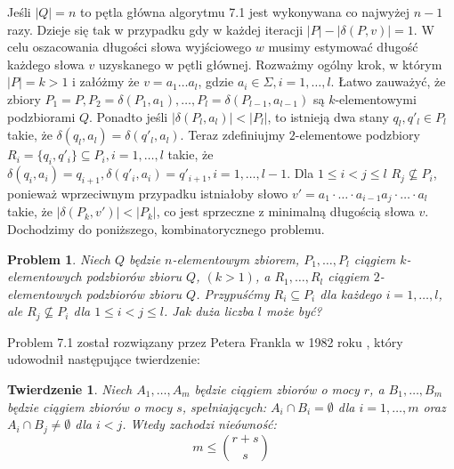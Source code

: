 \documentclass[12pt,a4paper]{article}
\newtheorem{twr}{Twierdzenie}[section]
\newtheorem{pro}{Problem}[section]
\begin{document}
 
Je\'sli $|Q|=n$ to p\k{e}tla g{\l}\'owna algorytmu 7.1 jest wykonywana co najwy\.zej $n-1$ razy. Dzieje si\k{e} tak w  przypadku gdy w każdej iteracji $|P|-|\delta(P,v)|=1$. W celu oszacowania d{\l}ugo\'sci s{\l}owa wyj\'sciowego $w$ musimy estymowa\'c d{\l}ugo\'s\'c ka\.zdego s{\l}owa $v$ uzyskanego w  p\k{e}tli g{\l}\'ownej. 
Rozwa\.zmy og\'olny krok, w kt\'orym $|P|=k>1$ i za{\l}\'o\.zmy \.ze $v=a_{1}\ldots a_{l}$, gdzie $a_{i}\in \Sigma, i=1,\ldots, l$. {\L}atwo zauwa\.zy\'c, \.ze zbiory $P_{1}=P, P_{2}=\delta(P_{1},a_{1}),\ldots, P_{l}=\delta(P_{l-1},a_{l-1})$ s\k{a} $k$-elementowymi podzbiorami $Q$. Ponadto je\'sli $|\delta(P_{l},a_{l})|<|P_{l}|$, to istniej\k{a} dwa stany $q_{l},q'_{l}\in P_{l}$ takie, \.ze $\delta(q_{l},a_{l})=\delta(q'_{l},a_{l})$. Teraz zdefiniujmy  $2$-elementowe podzbiory $R_{i}=\{q_{i},q'_{i}\}\subseteq P_{i}, i=1,\ldots,l$ takie, \.ze $\delta(q_{i},a_{i})=q_{i+1}, \delta(q'_{i},a_{i})=q'_{i+1}, i=1,\ldots,l-1$. Dla $1\leq i<j\leq l$ $R_{j}\not\subseteq P_{i}$, poniewa\.z wprzeciwnym przypadku istnia{\l}oby s{\l}owo $v'=a_{1}\cdot\ldots\cdot a_{i-1}a_{j}\cdot\ldots\cdot a_{l}$ takie, \.ze $|\delta(P_{k},v')|<|P_{k}|$, co jest sprzeczne z  minimaln\k{a} d{\l}ugo\'sci\k{a} s{\l}owa $v$. Dochodzimy do poni\.zszego, kombinatorycznego problemu.

\begin{pro}
Niech $Q$ b\k{e}dzie $n$-elementowym zbiorem, $P_{1},\ldots,P_{l}$ ci\k{a}giem $k$-elementowych podzbior\'ow zbioru $Q$, $(k>1)$, a $R_{1},\ldots,R_{l}$ ci\k{a}giem $2$-elementowych podzbior\'ow zbioru $Q$. Przypu\'s\'cmy $R_{i}\subseteq P_{i}$ dla ka\.zdego $i=1,\ldots,l$, ale $R_{j}\not\subseteq P_{i}$ dla $1\leq i<j\leq l$. Jak du\.za liczba $l$ mo\.ze by\'c?
\end{pro}

Problem 7.1 zosta{\l} rozwi\k{a}zany przez Petera Frankla w 1982 roku \cite{6}, kt\'ory udowodni{\l} nast\k{e}puj\k{a}ce twierdzenie: 

\begin{twr} 
Niech $A_{1},\ldots,A_{m}$ b\k{e}dzie ci\k{a}giem zbior\'ow o mocy $r$, a $B_{1},\ldots,B_{m}$ b\k{e}dzie ci\k{a}giem zbior\'ow o mocy $s$, spe{\l}niaj\k{a}cych: $A_{i}\cap B_{i}=\emptyset$ dla $i=1,\ldots,m$ oraz $A_{i}\cap B_{j}\neq\emptyset$ dla $i<j$. Wtedy zachodzi nie\'owno\'s\'c:
\begin{equation} 
m\leq{{r+s}\choose{s}}
\end{equation}
\end{twr} 
\end{document}
